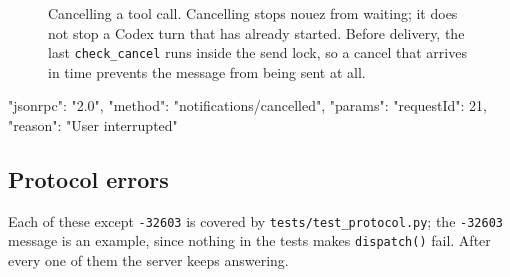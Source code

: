 \documentclass[10pt,a4paper]{article}
\newcommand{\lifelines}[2]{%
  \foreach \x/\name/\col in {#1} {%
    \node[actor, draw=\col, text=\col] at (\x,0) {\name};
    \draw[lifeline] (\x,-0.4) -- (\x,-#2);
  }}
\newcommand{\msg}[4]{\draw[call] (#2,-#1) -- node[above=1pt,lbl]{#4} (#3,-#1);}
\newcommand{\ret}[4]{\draw[reply] (#2,-#1) -- node[above=1pt,lbl]{#4} (#3,-#1);}
\newcommand{\side}[3]{\node[note, anchor=west] at (#2+0.15,-#1) {#3};}
\newcommand{\frm}[5]{%
  \draw[gray, rounded corners=2pt] (#3,-#1) rectangle (#4,-#2);
  \node[anchor=north west, font=\scriptsize\sffamily\bfseries, text=gray, fill=white, inner sep=2pt] at (#3,-#1) {#5};}
\newcommand{\code}[1]{\texttt{#1}}
\begin{document}
\begin{figure}[H]
\centering
{}
\caption{Cancelling a tool call. Cancelling stops nouez from waiting; it does not stop a Codex
turn that has already started. Before delivery, the last \code{check\_cancel} runs inside the
send lock, so a cancel that arrives in time prevents the message from being sent at all.}
\end{figure}

\begin{wire}
{"jsonrpc": "2.0", "method": "notifications/cancelled", "params": {"requestId": 21, "reason": "User interrupted"}}
\end{wire}

\subsection{Protocol errors}
\label{sec:errors}

Each of these except \code{-32603} is covered by \code{tests/test\_protocol.py}; the
\code{-32603} message is an example, since nothing in the tests makes \code{dispatch()} fail.
After every one of them the server keeps answering.
\end{document}
